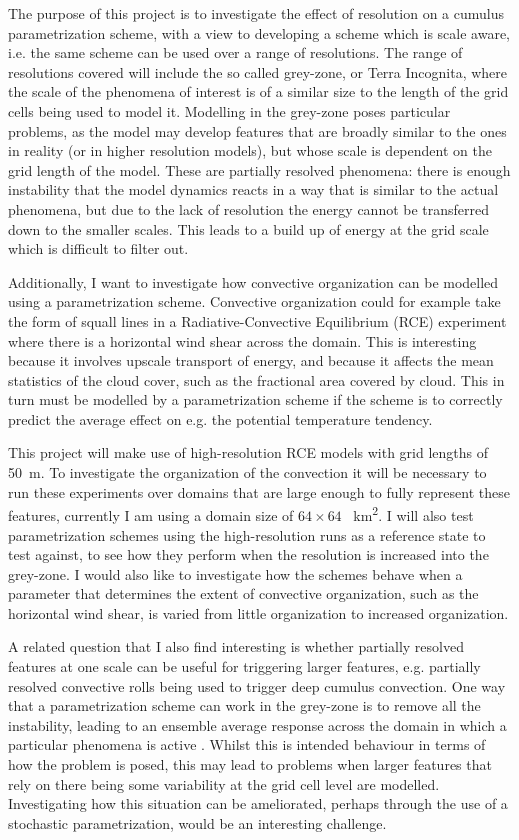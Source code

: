 \documentclass[11pt,a4paper]{article}
\begin{document}
The purpose of this project is to investigate the effect of resolution on a cumulus parametrization
scheme, with a view to developing a scheme which is scale aware, i.e. the same scheme can be used
over a range of resolutions. The range of resolutions covered will include the so called grey-zone,
or Terra Incognita, where the scale of the phenomena of interest is of a similar size to the length
of the grid cells being used to model it. Modelling in the grey-zone poses particular problems, as
the model may develop features that are broadly similar to the ones in reality (or in higher
resolution models), but whose scale is dependent on the grid length of the model. These are
partially resolved phenomena: there is enough instability that the model dynamics reacts in a way
that is similar to the actual phenomena, but due to the lack of resolution the energy cannot be
transferred down to the smaller scales. This leads to a build up of energy at the grid scale which
is difficult to filter out.

Additionally, I want to investigate how convective organization can be modelled using a
parametrization scheme. Convective organization could for example take the form of squall lines in a
Radiative-Convective Equilibrium (RCE) experiment where there is a horizontal wind shear across the
domain. This is interesting because it involves upscale transport of energy, and because it affects
the mean statistics of the cloud cover, such as the fractional area covered by cloud.  This in turn
must be modelled by a parametrization scheme if the scheme is to correctly predict the average
effect on e.g. the potential temperature tendency.

This project will make use of high-resolution RCE models with grid lengths of \SI{50}{m}. To
investigate the organization of the convection it will be necessary to run these experiments over
domains that are large enough to fully represent these features, currently I am using a domain size
of $64\times64$ \SI{}{km^2}. I will also test parametrization schemes using the high-resolution runs
as a reference state to test against, to see how they perform when the resolution is increased
into the grey-zone. I would also like to investigate how the schemes behave when a parameter that
determines the extent of convective organization, such as the horizontal wind shear, is varied from
little organization to increased organization.

A related question that I also find interesting is whether partially resolved features at one scale
can be useful for triggering larger features, e.g. partially resolved convective rolls being used to
trigger deep cumulus convection. One way that a parametrization scheme can work in the grey-zone is
to remove all the instability, leading to an ensemble average response across the domain in which a
particular phenomena is active \parencite{ching2014convectively}. Whilst this is intended behaviour in terms
of how the problem is posed, this may lead to problems when larger features that rely on there being
some variability at the grid cell level are modelled. Investigating how this situation can be
ameliorated, perhaps through the use of a stochastic parametrization, would be an interesting
challenge.
\end{document}
